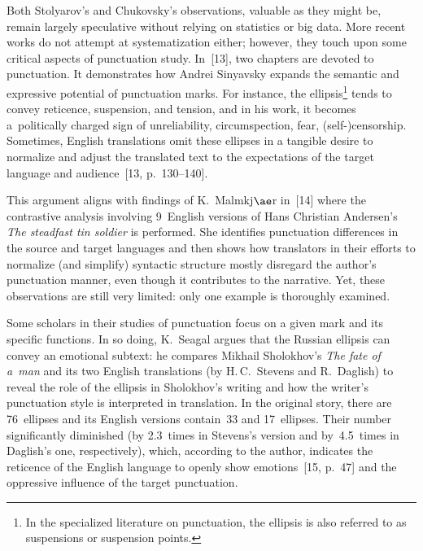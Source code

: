 \begin{multicols}{2}
    Both Stolyarov's and Chukovsky's observations, valuable as they might be, 
remain largely speculative without relying on statistics or big data. More recent 
works do not attempt at systematization either; however, they touch upon some 
critical aspects of punctuation study. In~[13],  two chapters are devoted to punctuation. It 
demonstrates how Andrei Sinyavsky expands the semantic and expressive potential 
of punctuation marks. For instance, the ellipsis\footnote{In the specialized 
literature on punctuation, the ellipsis is also referred to as suspensions or 
suspension points.} tends to convey reticence, suspension, and tension, and in his 
work, it becomes a~politically charged sign of unreliability, circumspection, fear, 
(self-)censorship. Sometimes, English translations omit these ellipses in a tangible 
desire to normalize and adjust the translated text to the expectations of the target 
language and audience~[13, p.~130--140].
    
    This argument aligns with findings of K.~Malmkj$\ae$r in~[14] where the contrastive analysis 
involving 9~English versions of Hans Christian Andersen's \textit{The steadfast 
tin soldier} is performed. She  identifies punctuation differences in 
the source and target languages and then shows how translators in their efforts to 
normalize (and simplify) syntactic structure mostly disregard the author's 
punctuation manner, even though it contributes to the narrative. Yet, these 
observations are still very limited: only one example is thoroughly examined.
    
    Some scholars in their studies of punctuation focus on a given mark and its 
specific functions. In so doing, K.~Seagal argues that the Russian ellipsis can 
convey an emotional subtext: he compares Mikhail Sholokhov's \textit{The fate of 
a~man} and its two English translations (by H.\,C.~Stevens and R.~Daglish) to 
reveal the role of the ellipsis in Sholokhov's writing and how the writer's 
punctuation style is interpreted in translation. In the original story, there are 
76~ellipses and its English versions contain~33 and 17~ellipses. Their number 
significantly diminished (by 2.3~times in Stevens's version and by~4.5~times in 
Daglish's one, respectively), which, according to the author, indicates the reticence 
of the English language to openly show emotions~[15, p.~47] and the oppressive 
influence of the target punctuation.
    

\end{multicols}
